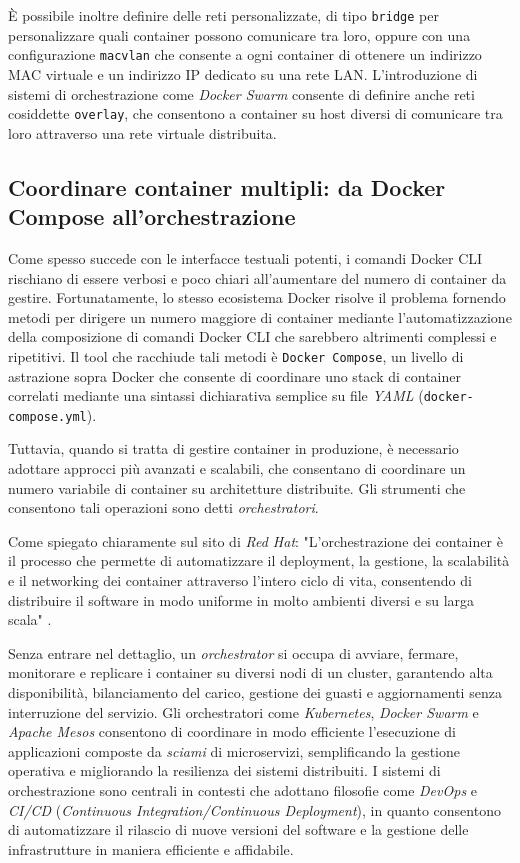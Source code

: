 È possibile inoltre definire delle reti personalizzate, di tipo \texttt{bridge} per personalizzare quali container possono comunicare tra loro, oppure con una configurazione \texttt{macvlan} che consente a ogni container di ottenere un indirizzo MAC virtuale e un indirizzo IP dedicato su una rete LAN. L'introduzione di sistemi di orchestrazione come \emph{Docker Swarm} consente di definire anche reti cosiddette \texttt{overlay}, che consentono a container su host diversi di comunicare tra loro attraverso una rete virtuale distribuita.

\subsection{Coordinare container multipli: da Docker Compose all'orchestrazione}
Come spesso succede con le interfacce testuali potenti, i comandi Docker CLI rischiano di essere verbosi e poco chiari all'aumentare del numero di container da gestire. Fortunatamente, lo stesso ecosistema Docker risolve il problema fornendo metodi per dirigere un numero maggiore di container mediante l'automatizzazione della composizione di comandi Docker CLI che sarebbero altrimenti complessi e ripetitivi.
Il tool che racchiude tali metodi è \texttt{Docker Compose}, un livello di astrazione sopra Docker che consente di coordinare uno stack di container correlati mediante una sintassi dichiarativa semplice su file \emph{YAML} (\texttt{docker-compose.yml}).

Tuttavia, quando si tratta di gestire container in produzione, è necessario adottare approcci più avanzati e scalabili, che consentano di coordinare un numero variabile di container su architetture distribuite. Gli strumenti che consentono tali operazioni sono detti \emph{orchestratori}.

Come spiegato chiaramente sul sito di \emph{Red Hat}: "L'orchestrazione dei container è il processo che permette di automatizzare il deployment, la gestione, la scalabilità e il networking dei container attraverso l'intero ciclo di vita, consentendo di distribuire il software in modo uniforme in molto ambienti diversi e su larga scala" \cite{RedHat_Orchestration}.

Senza entrare nel dettaglio, un \emph{orchestrator} si occupa di avviare, fermare, monitorare e replicare i container su diversi nodi di un cluster, garantendo alta disponibilità, bilanciamento del carico, gestione dei guasti e aggiornamenti senza interruzione del servizio. Gli orchestratori come \emph{Kubernetes}, \emph{Docker Swarm} e \emph{Apache Mesos} consentono di coordinare in modo efficiente l'esecuzione di applicazioni composte da \emph{sciami} di microservizi, semplificando la gestione operativa e migliorando la resilienza dei sistemi distribuiti.
I sistemi di orchestrazione sono centrali in contesti che adottano filosofie come \emph{DevOps} e \emph{CI/CD} (\emph{Continuous Integration/Continuous Deployment}), in quanto consentono di automatizzare il rilascio di nuove versioni del software e la gestione delle infrastrutture in maniera efficiente e affidabile.

